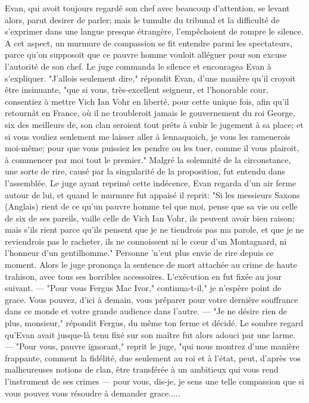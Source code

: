 Evan, qui avoit toujours regardé son chef avec beaucoup d'attention, se levant alors, parut desirer de parler; mais le tumulte du tribunal et la difficulté de s'exprimer dans une langue presque étrangère, l'empêchoient de rompre le silence. A cet aspect, un murmure de compassion se fit entendre parmi les spectateurs, parce qu'on supposoit que ce pauvre homme vouloit alléguer pour son excuse l'autorité de son chef. Le juge commanda le silence et encouragea Evan à s'expliquer. "J'allois seulement dire," répondit Evan, d'une manière qu'il croyoit être insinuante, "que si vous, très-excellent seigneur, et l'honorable cour, consentiez à mettre Vich Ian Vohr en liberté, pour cette unique fois, afin qu'il retournât en France, où il ne troubleroit jamais le gouvernement du roi George, six des meilleurs de, son clan seroient tout prêts à subir le jugement à sa place; et si vous vouliez senlement me laisser aller à lennaquoich,\setcounter{page}{375} je vous les ramenerois moi-même; pour que vous puissiez les pendre ou les tuer, comme il vous plairoit, à commencer par moi tout le premier."
Malgré la solemnité de la circonstance, une sorte de rire, causé par la singularité de la proposition, fut entendu dans l'assemblée. Le juge ayant reprimé cette indécence, Evan regarda d'un air ferme autour de lui, et quand le murmure fut appaisé il reprit:
"Si les messieurs Saxons (Anglais) rient de ce qu'un pauvre homme tel que moi, pense que sa vie ou celle de six de ses pareils, vaille celle de Vich Ian Vohr, ils peuvent avoir bien raison; mais s'ils rient parce qu'ils pensent que je ne tiendrois pas ma parole, et que je ne reviendrois pas le racheter, ils ne connoissent ni le cœur d'un Montagnard, ni l'honneur d'un gentilhomme."
Personne 'n'eut plus envie de rire depuis ce moment.
Alors le juge prononça la sentence de mort attachée au crime de haute trahison, avec tous ses horribles accessoires. L'exécution en fut fixée au jour suivant. — "Pour vous Fergus Mac Ivor," continua-t-il," je n'espère point de grace. Vous pouvez, d'ici à demain, vous préparer pour votre\setcounter{page}{376} dernière souffrance dans ce monde et votre grande audience dans l’autre.
— "Je ne désire rien de plus, monsieur," répondit Fergus, du même ton ferme et décidé.
Le sombre regard qu’Evan avait jusque-là tenu fixé sur son maître fut alors adouci par une larme. — "Pour vous, pauvre ignorant," reprit le juge, "qui nous montrez d’une manière frappante, comment la fidélité, due seulement au roi et à l’état, peut, d’après vos malheureuses notions de clan, être transférée à un ambitieux qui vous rend l’instrument de ses crimes — pour vous, dis-je, je sens une telle compassion que si vous pouvez vous résoudre à demander grace.....
